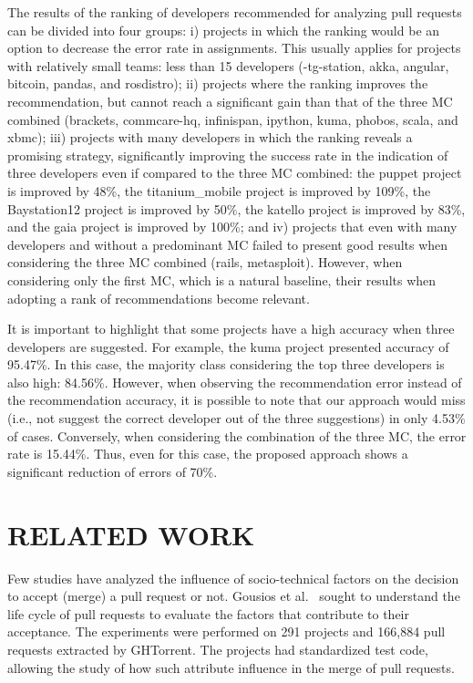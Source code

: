 \documentclass{sig-alternate}
\begin{document}
The results of the ranking of developers recommended for analyzing pull requests can be divided into four groups: i) projects in which the ranking would be an option to decrease the error rate in assignments. This usually applies for projects with relatively small teams: less than 15 developers (-tg-station, akka, angular, bitcoin, pandas, and rosdistro); ii) projects where the ranking improves the recommendation, but cannot reach a significant gain than that of the three MC combined (brackets, commcare-hq, infinispan, ipython, kuma, phobos, scala, and xbmc); iii) projects with many developers in which the ranking reveals a promising strategy, significantly improving the success rate in the indication of three developers even if compared to the three MC combined: the puppet project is improved by 48\%, the titanium\_mobile project is improved by 109\%, the Baystation12 project is improved by 50\%, the katello project is improved by 83\%, and the gaia project is improved by 100\%; and iv) projects that even with many developers and without a predominant MC failed to present good results when considering the three MC combined (rails, metasploit). However, when considering only the first MC, which is a natural baseline, their results when adopting a rank of recommendations become relevant.

It is important to highlight that some projects have a high accuracy when three developers are suggested. For example, the kuma project presented accuracy of 95.47\%. In this case, the majority class considering the top three developers is also high: 84.56\%. However, when observing the recommendation error instead of the recommendation accuracy, it is possible to note that our approach would miss (i.e., not suggest the correct developer out of the three suggestions) in only 4.53\% of cases. Conversely, when considering the combination of the three MC, the error rate is 15.44\%. Thus, even for this case, the proposed approach shows a significant reduction of errors of 70\%.

\section{RELATED WORK}
Few studies have analyzed the influence of socio-technical factors on the decision to accept (merge) a pull request or not. Gousios et al.~\cite{gousios_exploratory_2014} sought to understand the life cycle of pull requests to evaluate the factors that contribute to their acceptance. The experiments were performed on 291 projects and 166,884 pull requests extracted by GHTorrent. The projects had standardized test code, allowing the study of how such attribute influence in the merge of pull requests.
\end{document}
